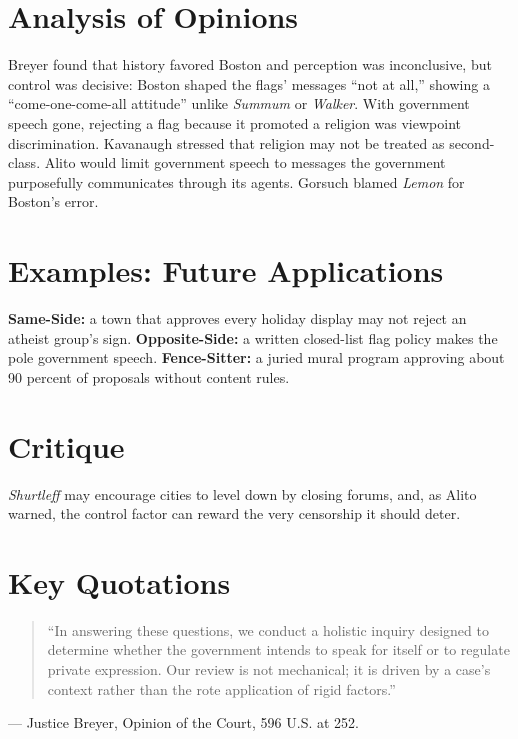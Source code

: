 \documentclass[12pt]{article}
\begin{document}
\section{Analysis of Opinions}
Breyer found that history favored Boston and perception was inconclusive, but control was decisive: Boston shaped the flags' messages ``not at all,'' showing a ``come-one-come-all attitude'' unlike \textit{Summum} or \textit{Walker}. With government speech gone, rejecting a flag because it promoted a religion was viewpoint discrimination. Kavanaugh stressed that religion may not be treated as second-class. Alito would limit government speech to messages the government purposefully communicates through its agents. Gorsuch blamed \textit{Lemon} for Boston's error.

\section{Examples: Future Applications}
\textbf{Same-Side:} a town that approves every holiday display may not reject an atheist group's sign. \textbf{Opposite-Side:} a written closed-list flag policy makes the pole government speech. \textbf{Fence-Sitter:} a juried mural program approving about 90 percent of proposals without content rules.

\section{Critique}
\textit{Shurtleff} may encourage cities to level down by closing forums, and, as Alito warned, the control factor can reward the very censorship it should deter.

\section{Key Quotations}
\begin{quote}
``In answering these questions, we conduct a holistic inquiry designed to determine whether the government intends to speak for itself or to regulate private expression. Our review is not mechanical; it is driven by a case's context rather than the rote application of rigid factors.''
\end{quote}
\noindent --- Justice Breyer, Opinion of the Court, 596 U.S. at 252.
\end{document}
